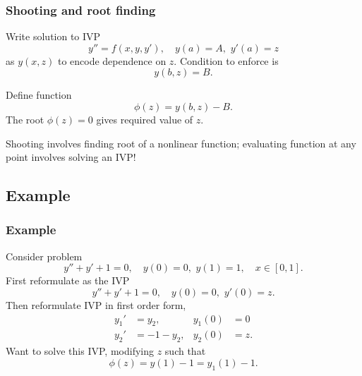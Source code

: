 \documentclass{beamer}
\begin{document}
\begin{frame}
  \frametitle{Shooting and root finding}

  Write solution to IVP
  \begin{equation*}
    y'' = f(x, y, y'), \quad y(a) = A, \,\, y'(a) = z
  \end{equation*}
  as $y(x, z)$ to encode dependence on $z$. Condition to enforce is
  \begin{equation*}
    y(b, z) = B.
  \end{equation*} \pause

  \vspace{1ex}

  Define function
  \begin{equation*}
    \phi(z) = y(b, z) - B.
  \end{equation*}
  The root $\phi(z) = 0$ gives required value of $z$. \pause

  \vspace{1ex}

  Shooting involves finding root of a nonlinear function; evaluating function at any point involves solving an
  IVP!

\end{frame}

\subsection{Example}

\begin{frame}
  \frametitle{Example}

  Consider problem
  \begin{equation*}
    y'' + y' + 1 = 0, \quad y(0) = 0, \,\, y(1) = 1, \quad x \in [0, 1].
  \end{equation*} \pause
  First reformulate as the IVP
  \begin{equation*}
    y'' + y' + 1 = 0, \quad y(0) = 0, \,\, y'(0) = z.
  \end{equation*} \pause
  Then reformulate IVP in first order form,
  \begin{align*}
    y_1' & = y_2, & y_1(0) & = 0 \\
    y_2' & = -1 - y_2, & y_2(0) & = z.
  \end{align*} \pause
  Want to solve this IVP, modifying $z$ such that
  \begin{equation*}
    \phi(z) = y(1) - 1 = y_1(1) - 1.
  \end{equation*}

\end{frame}
\end{document}
